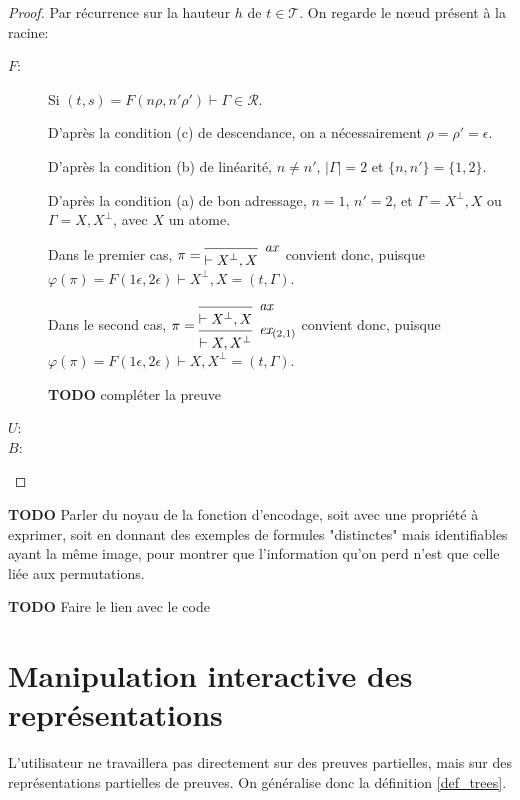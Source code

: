 \documentclass[11pt,a4paper]{article}
\theoremstyle{plain}
\theoremstyle{definition}
\theoremstyle{remark}
\newcommand*{\orth}{^\perp}
\newcommand*{\axv}[1]{\infer{0}[\ensuremath{\mathit{ax}}]{\vdash #1}}
\newcommand*{\permv}[2]{\infer{1}[\ensuremath{\textit{ex}_{#1}}]{\vdash #2}}
\newcommand*{\someproof}{\pi}
\newcommand*{\sequent}{\Gamma}
\newcommand*{\size}[1]{\mathopen{|}#1\mathclose{|}}
\newcommand*{\trees}{\ensuremath{\mathcal{T}}}
\newcommand*{\representations}{\ensuremath{\mathcal{R}}}
\newcommand*{\encode}{\ensuremath{\varphi}}
\newcommand*{\height}{\ensuremath{h}}
\newcommand*{\todo}{{\normalfont \textbf{TODO}} }
\begin{document}
\begin{proof}
Par récurrence sur la hauteur $\height$ de $t \in \trees$. On regarde le n\oe ud présent à la racine:
\begin{description}
    \item[$F$:]
    Si $(t, s) = F(n\rho, n'\rho') \vdash \sequent \in \representations$.

    D'après la condition (c) de descendance, on a nécessairement $\rho = \rho' = \epsilon$.

    D'après la condition (b) de linéarité, $n \neq n'$, $\size{\sequent} = 2$ et $\{n, n'\} = \{1, 2\}$.

    D'après la condition (a) de bon adressage, $n = 1$, $n' = 2$, et $\sequent = X\orth, X$ ou $\sequent = X, X\orth$, avec $X$ un atome.

    Dans le premier cas,
    $\someproof = \begin{prooftree}
            \axv{X\orth, X}
        \end{prooftree}$ convient donc, puisque $\encode \left( \someproof \right) = F(1 \epsilon, 2 \epsilon) \vdash X\orth, X = (t, \sequent)$.

    Dans le second cas,
    $\someproof = \begin{prooftree}
            \axv{X\orth, X}
            \permv{(2, 1)}{X, X\orth}
        \end{prooftree}$ convient donc, puisque $\encode \left( \someproof \right) = F(1 \epsilon, 2 \epsilon) \vdash X, X\orth = (t, \sequent)$.

     \todo{compléter la preuve}
     
    \item[$U$:] 

    \item[$B$:] 
  \end{description}
\end{proof}

\todo{Parler du noyau de la fonction d'encodage, soit avec une propriété à exprimer, soit en donnant des exemples de formules "distinctes" mais identifiables ayant la même image, pour montrer que l'information qu'on perd n'est que celle liée aux permutations.}

\todo{Faire le lien avec le code}

\section{Manipulation interactive des représentations}
L'utilisateur ne travaillera pas directement sur des preuves partielles, mais sur des représentations partielles de preuves. On généralise donc la définition \ref{def_trees}.
\end{document}
